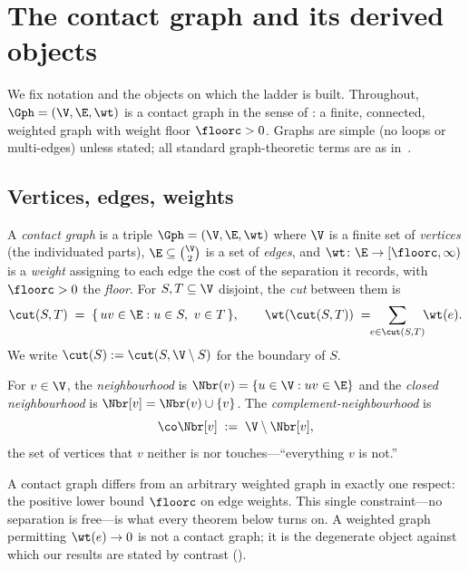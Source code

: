 
\section{The contact graph and its derived objects}
\label{sec:setting}

We fix notation and the objects on which the ladder is built. Throughout,
$\Gph=(\V,\E,\wt)$ is a contact graph in the sense of : a finite,
connected, weighted graph with weight floor $\floorc>0$. Graphs are simple
(no loops or multi-edges) unless stated; all standard graph-theoretic terms are
as in~\citet{bondymurty2008,diestel2017}.

\subsection{Vertices, edges, weights}

\begin{definition}
\label{def:contactgraph}
A \emph{contact graph} is a triple $\Gph=(\V,\E,\wt)$ where $\V$ is a finite set
of \emph{vertices} (the individuated parts), $\E\subseteq\binom{\V}{2}$ is a set
of \emph{edges}, and $\wt\colon\E\to[\floorc,\infty)$ is a \emph{weight}
assigning to each edge the cost of the separation it records, with
$\floorc>0$ the \emph{floor}. For $S,T\subseteq\V$ disjoint, the
\emph{cut} between them is
\[
\cut(S,T)\;=\;\{\,uv\in\E : u\in S,\ v\in T\,\},
\qquad
\wt(\cut(S,T))\;=\!\!\sum_{e\in\cut(S,T)}\!\!\wt(e).
\]
We write $\cut(S):=\cut(S,\V\setminus S)$ for the boundary of $S$.
\end{definition}

\begin{definition}
\label{def:nbr}
For $v\in\V$, the \emph{neighbourhood} is
$\Nbr(v)=\{u\in\V : uv\in\E\}$ and the \emph{closed neighbourhood} is
$\Nbr[v]=\Nbr(v)\cup\{v\}$. The \emph{complement-neighbourhood} is
\[
\co\Nbr[v]\;:=\;\V\setminus\Nbr[v],
\]
the set of vertices that $v$ neither is nor touches---``everything $v$ is not.''
\end{definition}

\begin{remark}
\label{rem:floor-content}
A contact graph differs from an arbitrary weighted graph in exactly one
respect: the positive lower bound $\floorc$ on edge weights. This single
constraint---no separation is free---is what every theorem below turns on. A
weighted graph permitting $\wt(e)\to0$ is not a contact graph; it is the
degenerate object against which our results are stated by contrast
().
\end{remark}

